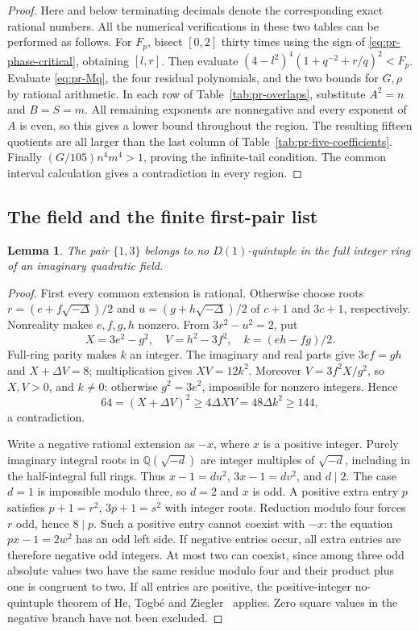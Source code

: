 \documentclass[12pt]{article}
\newtheorem{lemma}[theorem]{Lemma}
\numberwithin{equation}{section}
\begin{document}
\begin{proof}
Here and below terminating decimals denote the corresponding exact
rational numbers. All the numerical verifications in these two tables
can be performed as follows. For \(F_p\), bisect \([0,2]\) thirty times
using the sign of \eqref{eq:pr-phase-critical}, obtaining \([l,r]\).
Then evaluate
\((4-l^2)^4(1+q^{-2}+r/q)^2<F_p\).
Evaluate \eqref{eq:pr-Mq}, the four residual polynomials, and the two
bounds for \(G,\rho\) by rational arithmetic. In each row of
Table~\ref{tab:pr-overlaps}, substitute \(A^2=n\) and \(B=S=m\).
All remaining exponents are nonnegative and every exponent of \(A\)
is even, so this gives a lower bound throughout the region. The
resulting fifteen quotients are all larger than the last column of
Table~\ref{tab:pr-five-coefficients}. Finally
\((G/105)n^4m^4>1\), proving the infinite-tail condition. The common
interval calculation gives a contradiction in every region.
\end{proof}

\subsection{The field and the finite first-pair list}

\begin{lemma}\label{lem:pr-one-three}
The pair \(\{1,3\}\) belongs to no \(D(1)\)-quintuple in the full
integer ring of an imaginary quadratic field.
\end{lemma}
\begin{proof}
First every common extension is rational. Otherwise choose roots
\(r=(e+f\sqrt{-\Delta})/2\) and
\(u=(g+h\sqrt{-\Delta})/2\) of \(c+1\) and \(3c+1\), respectively.
Nonreality makes \(e,f,g,h\) nonzero. From \(3r^2-u^2=2\), put
\[
 X=3e^2-g^2,\quad V=h^2-3f^2,\quad k=(eh-fg)/2.
\]
Full-ring parity makes \(k\) an integer. The imaginary and real parts
give \(3ef=gh\) and \(X+\Delta V=8\); multiplication gives
\(XV=12k^2\). Moreover
\(V=3f^2X/g^2\), so \(X,V>0\), and \(k\ne0\): otherwise
\(g^2=3e^2\), impossible for nonzero integers. Hence
\[
 64=(X+\Delta V)^2\ge4\Delta XV=48\Delta k^2\ge144,
\]
a contradiction.

Write a negative rational extension as \(-x\), where \(x\) is a
positive integer. Purely imaginary integral roots in
\(\mathbb Q(\sqrt{-d})\) are integer multiples of \(\sqrt{-d}\),
including in the half-integral full rings. Thus
\(x-1=du^2\), \(3x-1=dv^2\), and \(d\mid2\).
The case \(d=1\) is impossible modulo three, so \(d=2\) and \(x\)
is odd. A positive extra entry \(p\) satisfies
\(p+1=r^2\), \(3p+1=s^2\) with integer roots. Reduction modulo four
forces \(r\) odd, hence \(8\mid p\). Such a positive entry cannot
coexist with \(-x\): the equation \(px-1=2w^2\) has an odd left
side. If negative entries occur, all extra entries are therefore
negative odd integers. At most two can coexist, since among three
odd absolute values two have the same residue modulo four and their
product plus one is congruent to two. If all entries are positive,
the positive-integer no-quintuple theorem of He, Togb\'e and
Ziegler~\cite{HTZ} applies. Zero square values in the negative branch
have not been excluded.
\end{proof}
\end{document}
